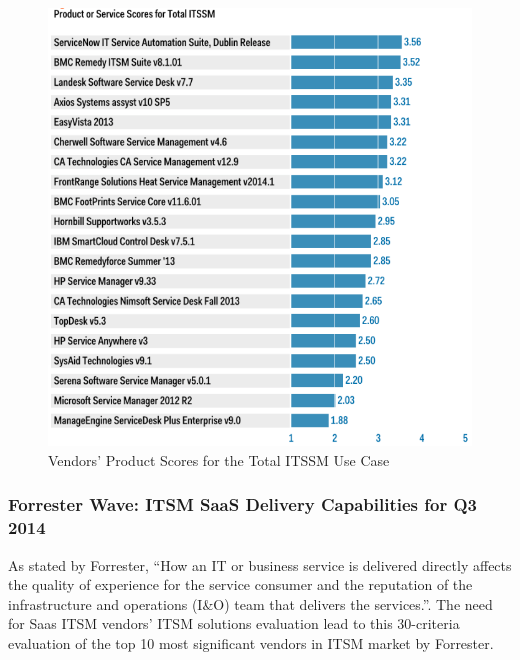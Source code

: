 \begin{figure}
\centering
\includegraphics{img/TotalITSMScores.png}
\caption{Vendors' Product Scores for the Total ITSSM Use Case}
\end{figure}


\subsubsection{Forrester Wave: ITSM SaaS Delivery Capabilities for Q3 2014}

As stated by Forrester, ``How an IT or business service is delivered directly affects the quality of experience for the service consumer and the reputation of the infrastructure and operations (I\&O) team that delivers the services.''. The need for Saas ITSM vendors' ITSM solutions evaluation lead to this 30-criteria evaluation of the top 10 most significant vendors in ITSM market by Forrester.\par

